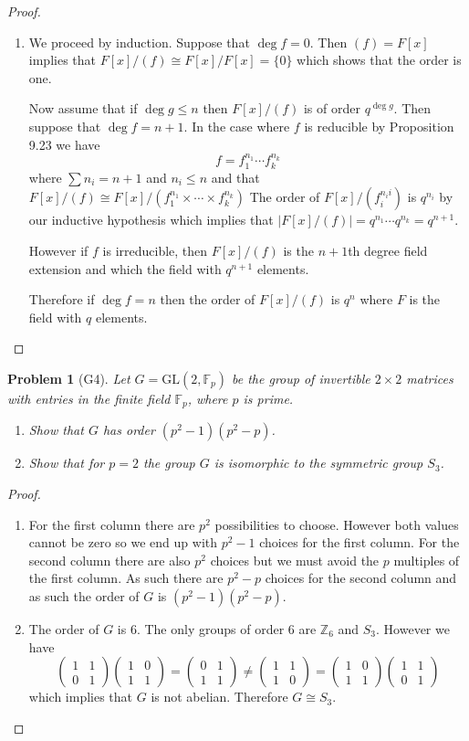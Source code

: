 \documentclass[10pt]{article}
\newcommand{\sk}{\vskip 10mm}
\newcommand{\bb}[1]{\mathbb{#1}}
\newcommand{\mm}[4]{\left(\begin{array}{cc}  #1 &  #2 \\ #3 & #4\end{array}\right)}
\theoremstyle{plain}
\newtheorem{problem}{Problem}
\theoremstyle{remark}
\begin{document}
\begin{proof}
  \begin{enumerate}
  \item We proceed by induction. Suppose that $\deg f=0$. Then $(f)=F[x]$
    implies that $F[x]/(f)\cong F[x]/F[x]=\{0\}$ which shows that the order is one.

    Now assume that if $\deg g \leq n$ then $F[x]/(f)$ is of order $q^{\deg g}$.
    Then suppose that $\deg f = n+1$. In the case where $f$ is reducible
    by Proposition 9.23 we have
    \[ f=f_1^{n_1}\cdots f_k^{n_k} \]
    where $\sum n_i=n+1$ and $n_i\leq n$ and that
    $F[x]/(f) \cong F[x]/(f_1^{n_1}\times\cdots\times f_k^{n_k})$
    The order of $F[x]/(f_i^{n_ii})$ is $q^{n_i}$ by our inductive hypothesis
    which implies that $|F[x]/(f)|=q^{n_1}\cdots q^{n_k}=q^{n+1}$.

    However if $f$ is irreducible, then $F[x]/(f)$ is the $n+1$th degree
    field extension and which the field with $q^{n+1}$ elements.

    Therefore if $\deg f=n$ then the order of $F[x]/(f)$ is $q^n$ where
    $F$ is the field with $q$ elements.
  \end{enumerate}
\end{proof}

\sk


\begin{problem}[G4]
  Let $G=\text{GL}(2,\bb{F}_p)$ be the group of invertible $2\times 2$ matrices
  with entries in the finite field $\bb{F}_p$, where $p$ is prime.
  \begin{enumerate}
  \item Show that $G$ has order $(p^2-1)(p^2-p)$.
  \item Show that for $p=2$ the group $G$ is isomorphic to the symmetric group
    $S_3$.
  \end{enumerate}
\end{problem}

\begin{proof}
  \begin{enumerate}
  \item For the first column there are $p^2$  possibilities to choose. However
    both values cannot be zero so we end up with $p^2-1$ choices for
    the first column. For the second column there are also $p^2$ choices
    but we must avoid the $p$ multiples of the first column.  As such
    there are $p^2-p$ choices for the second column and as such
    the order of $G$ is $(p^2-1)(p^2-p)$.
  \item The order of $G$ is 6. The only groups of order 6 are
    $\bb{Z}_6$ and $S_3$. However  we have
    \[ \mm{1}{1}{0}{1}\mm{1}{0}{1}{1}=\mm{0}{1}{1}{1}\neq \mm{1}{1}{1}{0}=\mm{1}{0}{1}{1} \mm{1}{1}{0}{1} \]
    which implies that $G$ is not abelian. Therefore $G\cong S_3$.
  \end{enumerate}
\end{proof}
\end{document}
